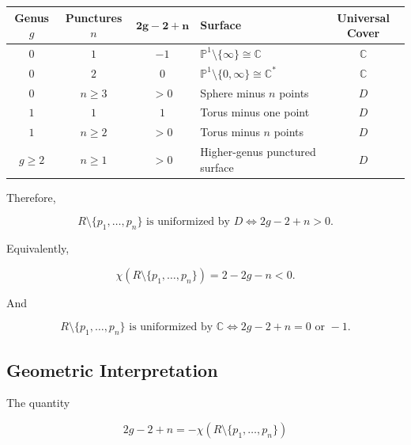 \documentclass[12pt,a4paper]{article}
\theoremstyle{notespace}
\begin{document}
\begin{center}
	\renewcommand{\arraystretch}{1.3}
	\begin{tabular}{|c|c|c|l|c|}
		\hline
		\textbf{Genus \(g\)} &
		\textbf{Punctures \(n\)} &
		\(\mathbf{2g-2+n}\) &
		\textbf{Surface} &
		\textbf{Universal Cover}
		\\
		\hline
		
		\(0\) & \(1\) & \(-1\)
		&
		\(\mathbb P^1\setminus\{\infty\}\cong\mathbb C\)
		&
		\(\mathbb C\)
		\\
		\hline
		
		\(0\) & \(2\) & \(0\)
		&
		\(\mathbb P^1\setminus\{0,\infty\}\cong\mathbb C^*\)
		&
		\(\mathbb C\)
		\\
		\hline
		
		\(0\) & \(n\ge 3\) & \(>0\)
		&
		Sphere minus \(n\) points
		&
		\(D\)
		\\
		\hline
		
		\(1\) & \(1\) & \(1\)
		&
		Torus minus one point
		&
		\(D\)
		\\
		\hline
		
		\(1\) & \(n\ge 2\) & \(>0\)
		&
		Torus minus \(n\) points
		&
		\(D\)
		\\
		\hline
		
		\(g\ge 2\) & \(n\ge 1\) & \(>0\)
		&
		Higher-genus punctured surface
		&
		\(D\)
		\\
		\hline
		
	\end{tabular}
\end{center}

\bigskip

Therefore,

\[
R\setminus\{p_1,\ldots,p_n\}
\text{ is uniformized by } D
\iff
2g-2+n>0.
\]

Equivalently,

\[
\chi\!\left(R\setminus\{p_1,\ldots,p_n\}\right)
=
2-2g-n
<0.
\]

\bigskip

And

\[
R\setminus\{p_1,\ldots,p_n\}
\text{ is uniformized by } \mathbb C
\iff
2g-2+n=0
\text{ or }
-1.
\]

\bigskip

\subsection{Geometric Interpretation}

The quantity

\[
2g-2+n
=
-\chi\!\left(R\setminus\{p_1,\ldots,p_n\}\right)
\]
\end{document}
